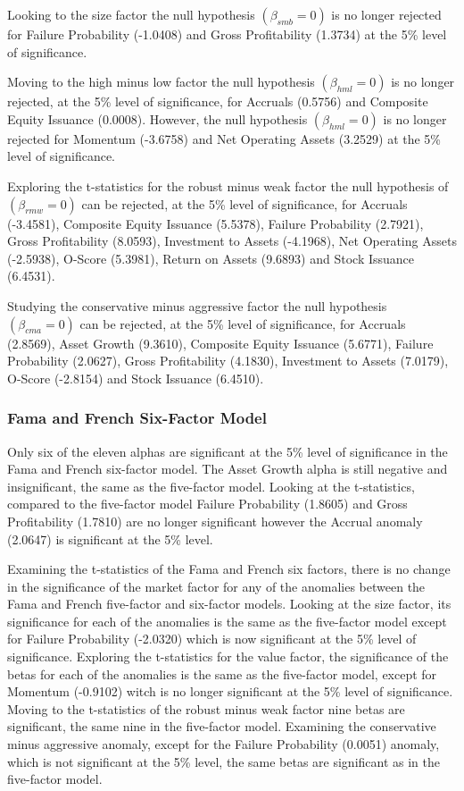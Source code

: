 \documentclass[12pt, a4paper, oneside]{article}
\begin{document}
Looking to the size factor the null hypothesis $(\beta_{smb}= 0)$ is no longer rejected for Failure Probability (-1.0408) and Gross Profitability (1.3734) at the 5\% level of significance.

Moving to the high minus low factor the null hypothesis $(\beta_{hml}= 0)$ is no longer rejected, at the 5\% level of significance, for Accruals (0.5756) and Composite Equity Issuance (0.0008). However, the null hypothesis $(\beta_{hml}= 0)$ is no longer rejected for Momentum (-3.6758) and Net Operating Assets (3.2529) at the 5\% level of significance.

Exploring the t-statistics for the robust minus weak factor the null hypothesis of $(\beta_{rmw}= 0)$ can be rejected, at the 5\% level of significance, for Accruals (-3.4581), Composite Equity Issuance (5.5378), Failure Probability (2.7921), Gross Profitability (8.0593), Investment to Assets (-4.1968), Net Operating Assets (-2.5938), O-Score (5.3981), Return on Assets (9.6893) and Stock Issuance (6.4531).

Studying the conservative minus aggressive factor the null hypothesis $(\beta_{cma}= 0)$ can be rejected, at the 5\% level of significance, for Accruals (2.8569), Asset Growth (9.3610), Composite Equity Issuance (5.6771), Failure Probability (2.0627), Gross Profitability (4.1830), Investment to Assets (7.0179), O-Score (-2.8154) and Stock Issuance (6.4510).

\subsubsection{Fama and French Six-Factor Model}
Only six of the eleven alphas are significant at the 5\% level of significance in the Fama and French six-factor model. The Asset Growth alpha is still negative and insignificant, the same as the five-factor model. Looking at the t-statistics, compared to the five-factor model Failure Probability (1.8605) and Gross Profitability (1.7810) are no longer significant however the Accrual anomaly (2.0647) is significant at the 5\% level.

Examining the t-statistics of the Fama and French six factors, there is no change in the significance of the market factor for any of the anomalies between the Fama and French five-factor and six-factor models. Looking at the size factor, its significance for each of the anomalies is the same as the five-factor model except for Failure Probability (-2.0320) which is now significant at the 5\% level of significance. Exploring the t-statistics for the value factor, the significance of the betas for each of the anomalies is the same as the five-factor model, except for Momentum (-0.9102) witch is no longer significant at the 5\% level of significance. Moving to the t-statistics of the robust minus weak factor nine betas are significant, the same nine in the five-factor model. Examining the conservative minus aggressive anomaly, except for the Failure Probability (0.0051) anomaly, which is not significant at the 5\% level, the same betas are significant as in the five-factor model.
\end{document}
